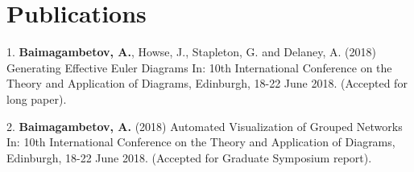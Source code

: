 \documentclass[a4paper,11pt]{article} %
\begin{document}
\section{Publications}

1. \textbf{Baimagambetov, A.}, Howse, J., Stapleton, G. and Delaney, A. (2018)
Generating Effective Euler Diagrams In:
10th International Conference on the Theory and Application of Diagrams, Edinburgh, 18-22 June 2018.
(Accepted for long paper).

2. \textbf{Baimagambetov, A.} (2018)
Automated Visualization of Grouped Networks In:
10th International Conference on the Theory and Application of Diagrams, Edinburgh, 18-22 June 2018.
(Accepted for Graduate Symposium report).
\end{document}
